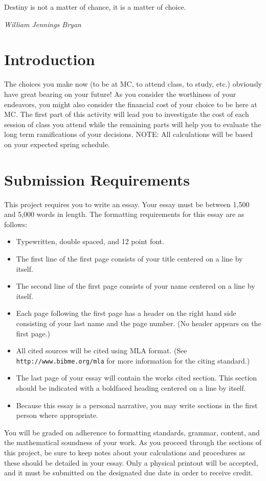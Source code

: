 \documentclass{article}
\begin{document}
    \epigraph{Destiny is not a matter of chance, it is a matter of choice.}{\textit{William Jennings Bryan}}

\section*{Introduction}
The choices you make now (to be at MC, to attend class, to study, etc.) obviously have great bearing 
on your future! As you consider the worthiness of your endeavors, you might also consider the 
financial cost of your choice to be here at MC. The first part of this activity will lead you to investigate 
the cost of each session of class you attend while the remaining parts will help you to evaluate the 
long term ramifications of your decisions. NOTE: 
All calculations will be based on your expected 
spring schedule.

\section*{Submission Requirements}
This project requires you to write an essay.  Your essay must be between 1,500 and 5,000 words in length.  The formatting requirements for this essay are as follows:
\begin{itemize}
    \item Typewritten, double spaced, and 12 point font.
    \item The first line of the first page consists of your title centered on a line by itself.
    \item The second line of the first page consists of your name centered on a line by itself.
    \item Each page following the first page has a header on the right hand side consisting of your last name and the page number.  (No header appears on the first page.)
    \item All cited sources will be cited using MLA format.\newline
    (See {\tt http://www.bibme.org/mla} for more information for the citing standard.)
    \item The last page of your essay will contain the
    works cited section.  This section should be indicated with a boldfaced heading centered on a line by itself.
    \item Because this essay is a personal narrative, you may write sections in the first person where appropriate.
\end{itemize}

You will be graded on adherence to formatting standards, grammar, content, and the mathematical soundness of your work.  As you proceed through the sections of this project, be sure to keep notes about your calculations and procedures as these should be detailed in your essay.  Only a physical printout will be accepted, and it must be submitted on the designated due date in order to receive credit.
\end{document}
